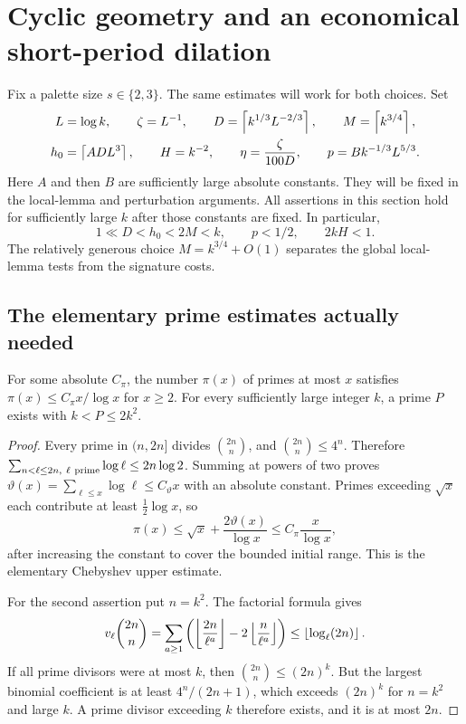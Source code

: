 \section{Cyclic geometry and an economical short-period dilation}
\label{sec:geometry}

Fix a palette size \(s\in\{2,3\}\). The same estimates will work for
both choices. Set
\begin{equation}\label{eq:parameters}
\begin{gathered}
 L=\log k,\qquad \zeta=L^{-1},\qquad
 D=\left\lceil k^{1/3}L^{-2/3}\right\rceil,\qquad M=\left\lceil k^{3/4}\right\rceil,\\
 h_0=\left\lceil A D L^3\right\rceil,\qquad H=k^{-2},\qquad
 \eta=\frac{\zeta}{100D},\qquad
 p=B k^{-1/3}L^{5/3}.
\end{gathered}
\end{equation}
Here \(A\) and then \(B\) are sufficiently large absolute constants.
They will be fixed in the local-lemma and perturbation arguments.
All assertions in this section hold for sufficiently large \(k\)
after those constants are fixed. In particular,
\[
 1\ll D<h_0<2M<k,\qquad p<1/2,\qquad 2kH<1.
\]
The relatively generous choice \(M=k^{3/4}+O(1)\) separates the
global local-lemma tests from the signature costs.

\subsection{The elementary prime estimates actually needed}

\begin{lemma}\label{lem:prime-estimates}
For some absolute \(C_\pi\), the number \(\pi(x)\) of primes at most
\(x\) satisfies \(\pi(x)\le C_\pi x/\log x\) for \(x\ge2\).
For every sufficiently large integer \(k\), a prime \(P\) exists with
\(k<P\le2k^2\).
\end{lemma}

\begin{proof}
Every prime in \((n,2n]\) divides \(\binom{2n}{n}\), and
\(\binom{2n}{n}\le4^n\). Therefore
\(\sum_{n<\ell\le2n,\ \ell\ {\rm prime}}\log\ell\le2n\log2\).
Summing at powers of two proves
\(\vartheta(x)=\sum_{\ell\le x}\log\ell\le C_\vartheta x\)
with an absolute constant. Primes exceeding \(\sqrt{x}\) each
contribute at least \(\frac12\log x\), so
\[
 \pi(x)\le \sqrt{x}+\frac{2\vartheta(x)}{\log x}
 \le C_\pi \frac{x}{\log x},
\]
after increasing the constant to cover the bounded initial range.
This is the elementary Chebyshev upper estimate.

For the second assertion put \(n=k^2\). The factorial formula gives
\[
 v_\ell\binom{2n}{n}
 =\sum_{a\ge1}
 \left(\left\lfloor \frac{2n}{\ell^a}\right\rfloor-2\left\lfloor \frac n{\ell^a}\right\rfloor\right)
 \le\left\lfloor \log_\ell(2n)\right\rfloor .
\]
If all prime divisors were at most \(k\), then
\(\binom{2n}{n}\le(2n)^k\).
But the largest binomial coefficient is at least \(4^n/(2n+1)\),
which exceeds \((2n)^k\) for \(n=k^2\) and large \(k\).
A prime divisor exceeding \(k\) therefore exists, and it is at most
\(2n\).
\end{proof}

